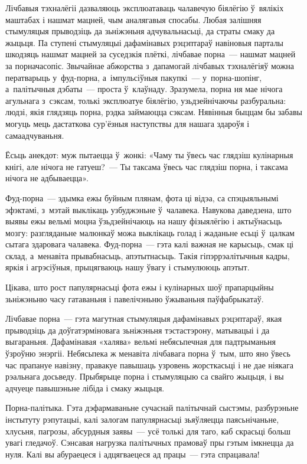 Лічбавыя тэхналёгіі дазваляюць эксплюатаваць чалавечую біялёгію ў~вялікіх маштабах і нашмат мацней, чым аналягавыя спосабы. Любая залішняя стымуляцыя прыводзіць да зьніжэньня адчувальнасьці, да страты смаку да жыцьця. Па ступені стымуляцыі дафамінавых рэцэптараў навіновыя парталы шкодзяць нашмат мацней за суседзкія плёткі, лічбавае порна~--- нашмат мацней за порначасопіс. Звычайнае абжорства з~дапамогай лічбавых тэхналёгіяў можна ператварыць у~фуд-порна, а~імпульсіўныя пакупкі~--- у~порна-шопінг, а~палітычныя дэбаты~--- проста ў~клаўнаду. Зразумела, порна ня мае нічога агульнага з~сэксам, толькі эксплюатуе біялёгію, узьдзейнічаючы разбуральна: людзі, якія глядзяць порна, рэдка займаюцца сэксам. Нявінныя быццам бы забавы могуць мець дастаткова сур'ёзныя наступствы для нашага здароўя і самаадчуваньня.

Ёсьць анекдот: муж пытаецца ў~жонкі: «Чаму ты ўвесь час глядзіш кулінарныя кнігі, але нічога не гатуеш?~--- Ты таксама ўвесь час глядзіш порна, і таксама нічога не адбываецца».

Фуд-порна~--- здымка ежы буйным плянам, фота ці відэа, са спэцыяльнымі эфэктамі, з~мэтай выклікаць узбуджэньне ў~чалавека. Навукова даведзена, што выявы ежы вельмі моцна ўзьдзейнічаюць на нашу фізыялёгію і актыўнасьць мозгу: разгляданьне малюнкаў можа выклікаць голад і жаданьне есьці ў~цалкам сытага здаровага чалавека. Фуд-порна~--- гэта калі важная не карысьць, смак ці склад, а~менавіта прывабнасьць, апэтытнасьць. Такія гіпэррэалітычныя кадры, яркія і агрэсіўныя, прыцягваюць нашу ўвагу і стымулююць апэтыт.

Цікава, што рост папулярнасьці фота ежы і кулінарных шоў прапарцыйны зьніжэньню часу гатаваньня і павелічэньню ўжываньня паўфабрыкатаў.

Лічбавае порна~--- гэта магутная стымуляцыя дафамінавых рэцэптараў, якая прыводзіць да доўгатэрміновага зьніжэньня тэстастэрону, матывацыі і да выгараньня. Дафамінавая «халява» вельмі небясьпечная для падтрыманьня ўзроўню энэргіі. Небясьпека ж менавіта лічбавага порна ў~тым, што яно ўвесь час прапануе навізну, правакуе павышаць узровень жорсткасьці і не дае ніякага рэальнага досьведу. Прыбярыце порна і стымуляцыю са свайго жыцьця, і вы адчуеце павышэньне лібіда і смаку жыцьця.

Порна-палітыка. Гэта дэфармаваньне сучаснай палітычнай сыстэмы, разбурэньне інстытуту рэпутацыі, калі залогам папулярнасьці зьяўляецца паясьнічаньне, хлусьня, пагрозы, абсурдныя заявы~--- усё толькі для таго, каб скрасьці больш увагі гледачоў. Сэнсавая нагрузка палітычных прамоваў пры гэтым імкнецца да нуля. Калі вы абураецеся і адцягваецеся ад працы~--- гэта спрацавала!

